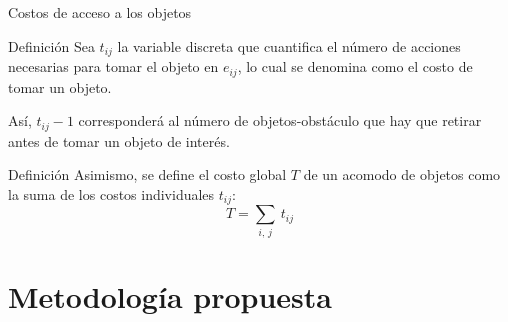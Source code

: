 \documentclass[14pt, aspectratio = 1610, xcolor=table, structureblod]{beamer}
\begin{document}
\begin{frame}{Costos de acceso a los objetos}
	\fontsize{14}{16}\selectfont
	\vspace{-5.5pt}%
	\begin{block}{Definición}
		Sea $t_{ij}$ la variable discreta que cuantifica el número de acciones necesarias para tomar el objeto en $e_{ij}$, lo cual se denomina como el costo de tomar un objeto.
	\end{block}
	Así, $t_{ij} - 1$ corresponderá al número de objetos-obstáculo que hay que retirar antes de tomar un objeto de interés.
	\vspace{-3pt}%
	\begin{block}{Definición}
		\setlength{\abovedisplayskip}{10pt}%
		Asimismo, se define el costo global $T$ de un acomodo de objetos como la suma de los costos individuales $t_{ij}$:
		\begin{equation*}
			T = \sum_{i,\,j}\ t_{ij}
		\end{equation*}
	\end{block}
\end{frame}


\section{Metodología propuesta}






\end{document}
